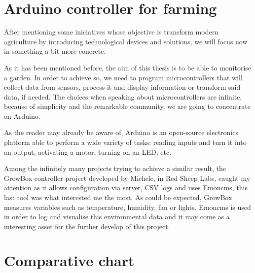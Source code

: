 \section{Arduino controller for farming}
After mentioning some iniciatives whose objective is transform modern agriculture by introducing technological devices and solutions, we will focus now in something a bit more concrete.

As it has been mentioned before, the aim of this thesis is to be able to monitorise a garden. In order to achieve so, we need to program microcontrollers that will collect data from sensors, process it and display information or transform said data, if needed. The choices when speaking about microcontrollers are infinite, because of simplicity and the remarkable community, we are going to concentrate on Arduino.

As the reader may already be aware of, Arduino is an open-source electronics platform able to perform a wide variety of tasks: reading inputs and turn it into an output, activating a motor, turning on an LED\cite{arduino}, etc.

Among the infinitely many projects trying to achieve a similar result, the GrowBox controller project developed by Michele, in Red Sheep Labs\cite{growbox}, caught my attention as it allows configuration via server, CSV logs and uses Emoncms, this last tool was what interested me the most. As could be expected, GrowBox measures variables such as temperature, humidity, fan or lights. Emoncms is used in order to log and visualise this environmental data and it may come as a interesting asset for the further develop of this project.

\section{Comparative chart}

